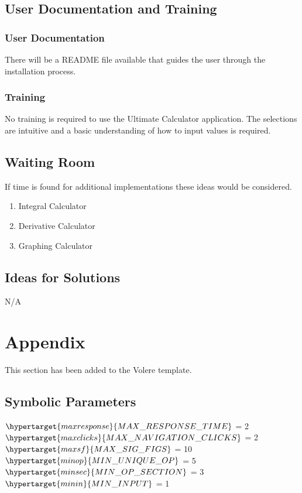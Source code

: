 \documentclass[12pt, titlepage]{article}
\begin{document}
\subsection{User Documentation and Training}
\subsubsection{User Documentation}
There will be a README file available that guides the user through the installation process.
\subsubsection{Training}
No training is required to use the Ultimate Calculator application. The selections are intuitive and a basic understanding of how to input values is required.
\subsection{Waiting Room}
If time is found for additional implementations these ideas would be considered.
\begin{enumerate}
    \item Integral Calculator
    \item Derivative Calculator
    \item Graphing Calculator
\end{enumerate}
\subsection{Ideas for Solutions}
N/A




\newpage

\section{Appendix}

This section has been added to the Volere template.

\subsection{Symbolic Parameters}
$\hypertarget{maxresponse}{MAX\_RESPONSE\_TIME}$ = 2\\
$\hypertarget{maxclicks}{MAX\_NAVIGATION\_CLICKS}$ = 2\\
$\hypertarget{maxsf}{MAX\_SIG\_FIGS}$ = 10\\
$\hypertarget{minop}{MIN\_UNIQUE\_OP}$ = 5\\
$\hypertarget{minsec}{MIN\_OP\_SECTION}$ = 3\\
$\hypertarget{minin}{MIN\_INPUT}$ = 1\\
\end{document}
